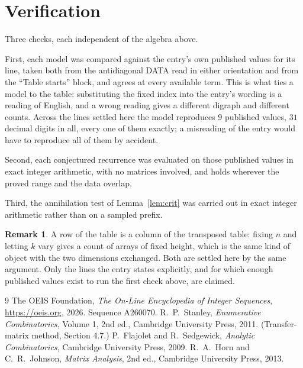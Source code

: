\documentclass[11pt,a4paper]{article}
\theoremstyle{plain}
\theoremstyle{definition}
\newtheorem{remark}[theorem]{Remark}
\begin{document}
\section{Verification}

Three checks, each independent of the algebra above.

First, each model was compared against the entry's own published values for its line, taken
both from the antidiagonal DATA read in either orientation and from the ``Table starts''
block, and agrees at every available term. This is what ties a model to the table:
substituting the fixed index into the entry's wording is a reading of English, and a wrong
reading gives a different digraph and different counts. Across the lines settled here the
model reproduces $9$ published values, $31$ decimal digits in all, every one of
them exactly; a misreading of the entry would have to reproduce all of them by accident.

Second, each conjectured recurrence was evaluated on those published values in exact
integer arithmetic, with no matrices involved, and holds wherever the proved range and the
data overlap.

Third, the annihilation test of Lemma~\ref{lem:crit} was carried out in exact integer
arithmetic rather than on a sampled prefix.

\begin{remark}
A row of the table is a column of the transposed table: fixing $n$ and letting $k$ vary gives a
count of arrays of fixed height, which is the same kind of object with the two dimensions
exchanged. Both are settled here by the same argument. Only the lines the entry states
explicitly, and for which enough published values exist to run the first check above, are
claimed.
\end{remark}

\begin{thebibliography}{9}
 The OEIS Foundation, \emph{The On-Line Encyclopedia of Integer
Sequences}, \url{https://oeis.org}, 2026. Sequence A260070.
 R.~P.~Stanley, \emph{Enumerative Combinatorics}, Volume 1, 2nd ed.,
Cambridge University Press, 2011. (Transfer-matrix method, Section 4.7.)
 P.~Flajolet and R.~Sedgewick, \emph{Analytic Combinatorics}, Cambridge
University Press, 2009.
 R.~A.~Horn and C.~R.~Johnson, \emph{Matrix Analysis}, 2nd ed., Cambridge
University Press, 2013.
\end{thebibliography}
\end{document}
